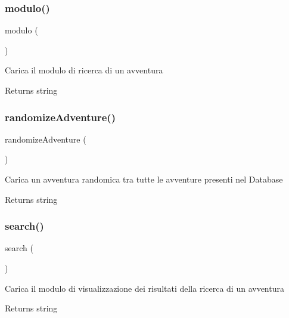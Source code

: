 \subsubsection{\texorpdfstring{modulo()}{modulo()}}
{\footnotesize\ttfamily modulo (\begin{DoxyParamCaption}{ }\end{DoxyParamCaption})}

Carica il modulo di ricerca di un avventura

\begin{DoxyReturn}{Returns}
string 
\end{DoxyReturn}
\mbox{\label{class_c_ricerca_a1882c9da84dc67772d89caa949280531}} 
\subsubsection{\texorpdfstring{randomize\+Adventure()}{randomizeAdventure()}}
{\footnotesize\ttfamily randomize\+Adventure (\begin{DoxyParamCaption}{ }\end{DoxyParamCaption})}

Carica un avventura randomica tra tutte le avventure presenti nel Database

\begin{DoxyReturn}{Returns}
string 
\end{DoxyReturn}
\mbox{\label{class_c_ricerca_a796bf438724e047aeef18579732a3780}} 
\subsubsection{\texorpdfstring{search()}{search()}}
{\footnotesize\ttfamily search (\begin{DoxyParamCaption}{ }\end{DoxyParamCaption})}

Carica il modulo di visualizzazione dei risultati della ricerca di un avventura

\begin{DoxyReturn}{Returns}
string 
\end{DoxyReturn}
\mbox{\label{class_c_ricerca_a2b8e3779f5bd8c38f70307574859bd36}} 
